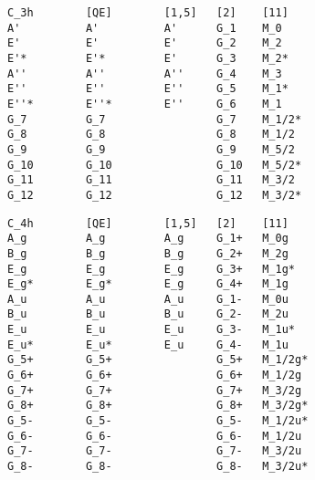 \documentclass[12pt,a4paper,twoside]{report}
\begin{document}
\begin{tcolorbox}
\begin{footnotesize}
\begin{verbatim}
C_3h        [QE]        [1,5]   [2]    [11] 
A'          A'          A'      G_1    M_0
E'          E'          E'      G_2    M_2
E'*         E'*         E'      G_3    M_2*
A''         A''         A''     G_4    M_3
E''         E''         E''     G_5    M_1*
E''*        E''*        E''     G_6    M_1
G_7         G_7                 G_7    M_1/2*
G_8         G_8                 G_8    M_1/2
G_9         G_9                 G_9    M_5/2
G_10        G_10                G_10   M_5/2*
G_11        G_11                G_11   M_3/2
G_12        G_12                G_12   M_3/2*
\end{verbatim}
\end{footnotesize}
\end{tcolorbox}

\begin{tcolorbox}
\begin{footnotesize}
\begin{verbatim}
C_4h        [QE]        [1,5]   [2]    [11]
A_g         A_g         A_g     G_1+   M_0g
B_g         B_g         B_g     G_2+   M_2g
E_g         E_g         E_g     G_3+   M_1g*
E_g*        E_g*        E_g     G_4+   M_1g
A_u         A_u         A_u     G_1-   M_0u
B_u         B_u         B_u     G_2-   M_2u
E_u         E_u         E_u     G_3-   M_1u*
E_u*        E_u*        E_u     G_4-   M_1u
G_5+        G_5+                G_5+   M_1/2g*
G_6+        G_6+                G_6+   M_1/2g
G_7+        G_7+                G_7+   M_3/2g
G_8+        G_8+                G_8+   M_3/2g*
G_5-        G_5-                G_5-   M_1/2u*
G_6-        G_6-                G_6-   M_1/2u
G_7-        G_7-                G_7-   M_3/2u
G_8-        G_8-                G_8-   M_3/2u*
\end{verbatim}
\end{footnotesize}
\end{tcolorbox}
\end{document}
